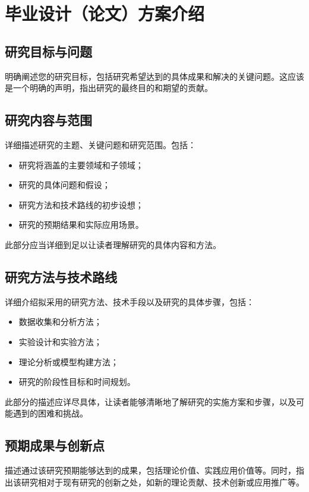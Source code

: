 \section{毕业设计（论文）方案介绍}

\subsection{研究目标与问题}

明确阐述您的研究目标，包括研究希望达到的具体成果和解决的关键问题。这应该是一个明确的声明，指出研究的最终目的和期望的贡献。

\subsection{研究内容与范围}

详细描述研究的主题、关键问题和研究范围。包括：
\begin{itemize}
    \item 研究将涵盖的主要领域和子领域；
    \item 研究的具体问题和假设；
    \item 研究方法和技术路线的初步设想；
    \item 研究的预期结果和实际应用场景。
\end{itemize}
此部分应当详细到足以让读者理解研究的具体内容和方法。

\subsection{研究方法与技术路线}

详细介绍拟采用的研究方法、技术手段以及研究的具体步骤，包括：
\begin{itemize}
    \item 数据收集和分析方法；
    \item 实验设计和实验方法；
    \item 理论分析或模型构建方法；
    \item 研究的阶段性目标和时间规划。
\end{itemize}

此部分的描述应详尽具体，让读者能够清晰地了解研究的实施方案和步骤，以及可能遇到的困难和挑战。

\subsection{预期成果与创新点}

描述通过该研究预期能够达到的成果，包括理论价值、实践应用价值等。同时，指出该研究相对于现有研究的创新之处，如新的理论贡献、技术创新或应用推广等。